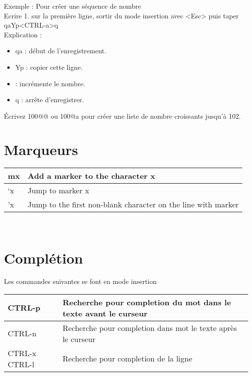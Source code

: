 \documentclass{article}
\begin{document}
                    \noindent
                    Exemple : Pour créer une séquence de nombre\\
                    \noindent
                    Ecrire 1. sur la première ligne, sortir du mode insertion avec <Esc> puis taper qaYp<CTRL-a>q\\
                    Explication :
                    \begin{itemize}
                            \renewcommand{\labelitemi}{$\bullet$}
                        \item qa : début de l'enregistrement.
                        \item Yp : copier cette ligne.
                        \item <CTRL-a> : incrémente le nombre.
                        \item q : arrête d'enregistrer.
                    \end{itemize}
                    Écrivez 100@@ ou 100@a pour créer une liste de nombre croissants jusqu'à 102.
                    \section{Marqueurs}
                    \begin{tabular}{|p{3cm}| l| }
                        \hline
                        mx & Add a marker to the character x\\ \hline
                        `x & Jump to marker x\\ \hline
                        'x & Jump to the first non-blank character on the line with marker\\ \hline
                    \end{tabular}\\

                    \section{Complétion}
                    Les commandes suivantes se font en mode insertion\\


                    \begin{tabular}{|p{3cm}| l| }
                        \hline
                        CTRL-p & Recherche pour completion du mot dans le texte avant le curseur \\ \hline
                        CTRL-n & Recherche pour completion dans mot le texte après le curseur \\ \hline
                        CTRL-x CTRL-l &	Recherche pour completion de la ligne \\ \hline
                    \end{tabular}\\
\end{document}
